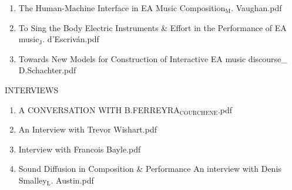 \documentclass[11pt]{article}
\begin{document}
\begin{enumerate}
\item The Human-Machine Interface in EA Music Composition$_{\text{M}}$. Vaughan.pdf
\label{sec-1-1-1-1-49-1-15-15}

\item To Sing the Body Electric Instruments \& Effort in the Performance of EA music$_{\text{J}}$. d'Escriván.pdf
\label{sec-1-1-1-1-49-1-15-16}

\item Towards New Models for Construction of Interactive EA music discourse\_ D.Schachter.pdf
\label{sec-1-1-1-1-49-1-15-17}
\end{enumerate}

\item INTERVIEWS
\label{sec-1-1-1-1-49-1-16}
\begin{enumerate}
\item A CONVERSATION WITH B.FERREYRA$_{\text{COURCHENE}}$.pdf
\label{sec-1-1-1-1-49-1-16-1}

\item An Interview with Trevor Wishart.pdf
\label{sec-1-1-1-1-49-1-16-2}

\item Interview with Francois Bayle.pdf
\label{sec-1-1-1-1-49-1-16-3}

\item Sound Diffusion in Composition \& Performance An interview with Denis Smalley$_{\text{L}}$. Austin.pdf
\label{sec-1-1-1-1-49-1-16-4}
\end{enumerate}
\end{document}
